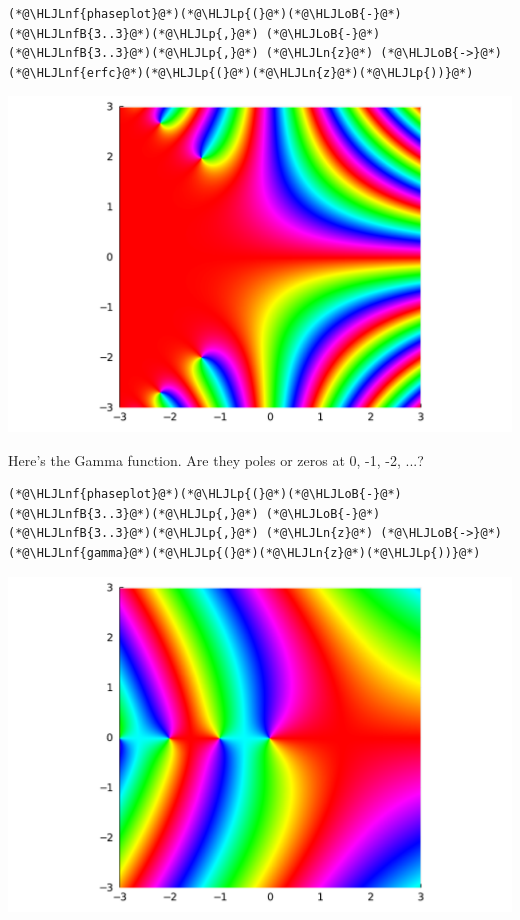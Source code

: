 \documentclass[12pt,a4paper]{article}
\newcommand{\HLJLn}[1]{#1}
\newcommand{\HLJLnf}[1]{\textcolor[RGB]{66,102,213}{#1}}
\newcommand{\HLJLnfB}[1]{\textcolor[RGB]{59,151,46}{#1}}
\newcommand{\HLJLoB}[1]{\textcolor[RGB]{102,102,102}{\textbf{#1}}}
\newcommand{\HLJLp}[1]{#1}
\begin{document}
\begin{lstlisting}
(*@\HLJLnf{phaseplot}@*)(*@\HLJLp{(}@*)(*@\HLJLoB{-}@*)(*@\HLJLnfB{3..3}@*)(*@\HLJLp{,}@*) (*@\HLJLoB{-}@*)(*@\HLJLnfB{3..3}@*)(*@\HLJLp{,}@*) (*@\HLJLn{z}@*) (*@\HLJLoB{->}@*) (*@\HLJLnf{erfc}@*)(*@\HLJLp{(}@*)(*@\HLJLn{z}@*)(*@\HLJLp{))}@*)
\end{lstlisting}

\includegraphics[width=\linewidth]{jl_z7eR69/Lecture1_14_1.pdf}

Here's the Gamma function. Are they poles or zeros at 0, -1, -2, ...?


\begin{lstlisting}
(*@\HLJLnf{phaseplot}@*)(*@\HLJLp{(}@*)(*@\HLJLoB{-}@*)(*@\HLJLnfB{3..3}@*)(*@\HLJLp{,}@*) (*@\HLJLoB{-}@*)(*@\HLJLnfB{3..3}@*)(*@\HLJLp{,}@*) (*@\HLJLn{z}@*) (*@\HLJLoB{->}@*) (*@\HLJLnf{gamma}@*)(*@\HLJLp{(}@*)(*@\HLJLn{z}@*)(*@\HLJLp{))}@*)
\end{lstlisting}

\includegraphics[width=\linewidth]{jl_z7eR69/Lecture1_15_1.pdf}
\end{document}
